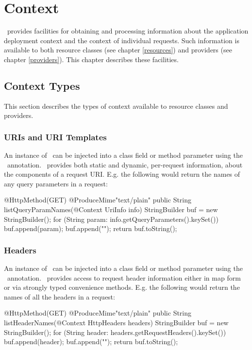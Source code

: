 \chapter{Context}
\label{context}

\jaxrs\ provides facilities for obtaining and processing information about the application deployment context and the context of individual requests. Such information is available to both resource classes (see chapter \ref{resources}) and providers (see chapter \ref{providers}). This chapter describes these facilities.

\section{Context Types}
\label{contexttypes}

This section describes the types of context available to resource classes and providers.

\subsection{URIs and URI Templates}

An instance of \UriInfo\ can be injected into a class field or method parameter using the \Context\ annotation. \UriInfo\ provides both static and dynamic, per-request information, about the components of a request URI. E.g. the following would return the names of any query parameters in a request:

\begin{listing}{1}
@HttpMethod(GET)
@ProduceMime{"text/plain"}
public String listQueryParamNames(@Context UriInfo info) {
  StringBuilder buf = new StringBuilder();
  for (String param: info.getQueryParameters().keySet()) {
    buf.append(param);
    buf.append("\n");
  }
  return buf.toString();
}
\end{listing} 

\subsection{Headers}

An instance of \HttpHeaders\ can be injected into a class field or method parameter using the \Context\ annotation. \HttpHeaders\ provides access to request header information either in map form or via strongly typed convenience methods. E.g. the following would return the names of all the headers in a request:

\begin{listing}{1}
@HttpMethod(GET)
@ProduceMime{"text/plain"}
public String listHeaderNames(@Context HttpHeaders headers) {
  StringBuilder buf = new StringBuilder();
  for (String header: headers.getRequestHeaders().keySet()) {
    buf.append(header);
    buf.append("\n");
  }
  return buf.toString();
}
\end{listing}

